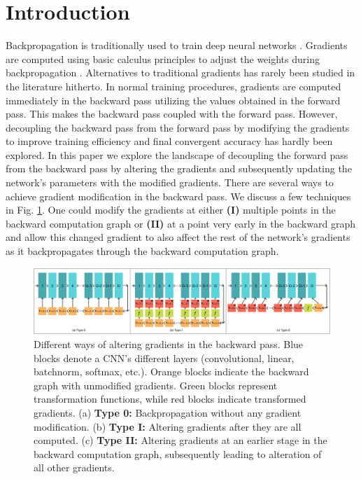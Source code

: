 \documentclass[times,sort&compress]{elsarticle}
\begin{document}
\section{Introduction}
\label{sec:Intr}





Backpropagation is traditionally used to train deep neural networks
\cite{lillicrap2020backpropagation}. Gradients are computed using basic calculus
principles to adjust the weights during backpropagation \cite{lecun1988theoretical}.
Alternatives to traditional gradients has rarely been studied in the literature
hitherto. In normal training procedures, gradients are computed immediately in the
backward pass utilizing the values obtained in the forward pass. This makes the backward
pass coupled with the forward pass. However, decoupling the backward pass from the
forward pass by modifying the gradients to improve training efficiency and final
convergent accuracy has hardly been explored. In this paper we explore the landscape of
decoupling the forward pass from the backward pass by altering the gradients and
subsequently updating the network's parameters with the modified gradients. There are
several ways to achieve gradient modification in the backward pass. We discuss a few
techniques in Fig. \ref{fig:gradient_altering}. One could modify the gradients at either
\textbf{(I)} multiple points in the backward computation graph or \textbf{(II)} at a
point very early in the backward graph and allow this changed gradient to also affect
the rest of the network's gradients as it backpropagates through the backward
computation graph.



\begin{figure}[t]
\centering
\includegraphics[width=\textwidth]{PGT_Types}
\caption{ Different ways of altering gradients in the backward pass. Blue blocks denote
a CNN's different layers (convolutional, linear, batchnorm, softmax, etc.). Orange
blocks indicate the backward graph with unmodified gradients. Green blocks represent
transformation functions, while red blocks indicate transformed gradients. (a)
\textbf{Type 0:} Backpropagation without any gradient modification. (b) \textbf{Type I:}
Altering gradients after they are all computed. (c) \textbf{Type II:} Altering gradients
at an earlier stage in the backward computation graph, subsequently leading to
alteration of all other gradients. }
\label{fig:gradient_altering}
\end{figure}
\end{document}
